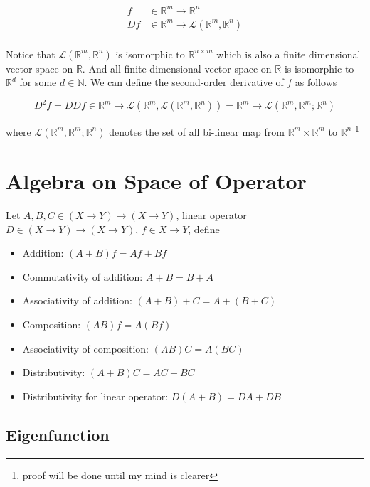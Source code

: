\documentclass{article}
\begin{document}
\begin{align*}
    f   &\in \mathbb{R}^m \to \mathbb{R}^n \\
    Df  &\in \mathbb{R}^m \to \mathcal{L}(\mathbb{R}^m, \mathbb{R}^n) \\ 
\end{align*}

Notice that $\mathcal{L}(\mathbb{R}^m, \mathbb{R}^n)$ is isomorphic to $\mathbb{R}^{n \times m}$ which is also a finite dimensional vector space on $\mathbb{R}$. And all finite dimensional vector space on $\mathbb{R}$ is isomorphic to $\mathbb{R}^d$ for some $d \in \mathbb{N}$. We can define the second-order derivative of $f$ as follows

\begin{equation}
    D^2 f  = DDf \in \mathbb{R}^m \to \mathcal{L}(\mathbb{R}^m, \mathcal{L}(\mathbb{R}^m, \mathbb{R}^n)) = \mathbb{R}^m \to \mathcal{L}(\mathbb{R}^m, \mathbb{R}^m; \mathbb{R}^n)
\end{equation}

where $\mathcal{L}(\mathbb{R}^m, \mathbb{R}^m; \mathbb{R}^n)$ denotes the set of all bi-linear map from $\mathbb{R}^m \times \mathbb{R}^m$ to $\mathbb{R}^n$ \footnote{proof will be done until my mind is clearer}

\section{Algebra on Space of Operator}

Let $A, B, C \in (X \to Y) \to (X \to Y)$, linear operator $D \in (X \to Y) \to (X \to Y)$, $f \in X \to Y$, define

\begin{itemize}
    \item Addition: $(A + B)f = Af + Bf$
    \item Commutativity of addition: $A + B = B + A$
    \item Associativity of addition: $(A + B) + C = A + (B + C)$
    \item Composition: $(AB)f = A (Bf)$
    \item Associativity of composition: $(AB)C = A(BC)$
    \item Distributivity: $(A + B)C = AC + BC$
    \item Distributivity for linear operator: $D(A + B) = DA + DB $
\end{itemize}

\subsection{Eigenfunction}
\end{document}
